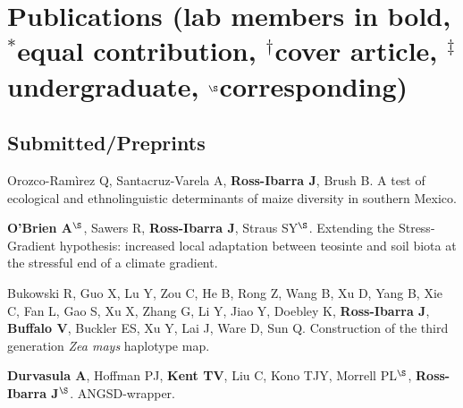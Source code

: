 \documentclass[letterpaper]{article}
\renewenvironment{itemize}{
  \begin{list}{}{
    \setlength{\leftmargin}{1.5em}
  }
}{
  \end{list}
}
\begin{document}
\begin{itemize}
\end{itemize}


\section*{Publications {\small(lab members in bold, $^*$equal contribution, $^\dagger$cover article, $^\ddagger$undergraduate, $^\S$corresponding)}} 
\subsection*{Submitted/Preprints}
\begin{itemize}

\item Orozco-Ram\`{i}rez Q, Santacruz-Varela A, {\bf Ross-Ibarra J}, Brush B. A test of ecological and ethnolinguistic determinants of maize diversity in southern Mexico.

\item {\bf O'Brien A}$^\S$, Sawers R, {\bf Ross-Ibarra J}, Straus SY$^\S$. Extending the Stress-Gradient hypothesis: increased local adaptation between teosinte and soil biota at the stressful end of a climate gradient. 

\item Bukowski R, Guo X, Lu Y, Zou C, He B, Rong Z, Wang B,  Xu D,  Yang B, Xie C,  Fan L, Gao S, Xu X, Zhang G, Li Y, Jiao Y, Doebley K, {\bf Ross-Ibarra J}, {\bf Buffalo V}, Buckler ES, Xu Y,  Lai J, Ware D, Sun Q. Construction of the third generation \emph{Zea mays} haplotype map.  

\item {\bf Durvasula A},  Hoffman PJ, {\bf Kent TV}, Liu C, Kono TJY, Morrell PL$^\S$, {\bf Ross-Ibarra J}$^\S$. ANGSD-wrapper.

\end{itemize}
\end{document}
